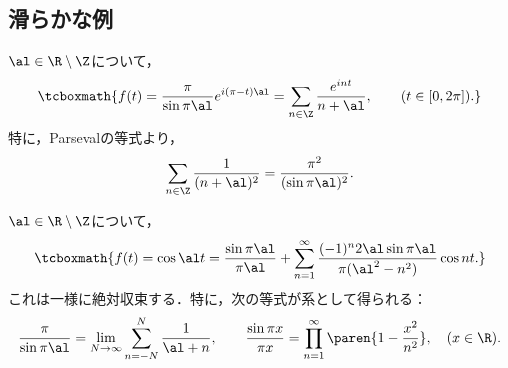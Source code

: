 \documentclass[uplatex,dvipdfmx]{jsreport}
\begin{document}
\subsection{滑らかな例}

\begin{example}
    $\al\in\R\setminus\Z$について，
    \[\tcboxmath{f(t)=\frac{\pi}{\sin\pi\al}e^{i(\pi-t)\al}=\sum_{n\in\Z}\frac{e^{int}}{n+\al},\qquad(t\in[0,2\pi]).}\]
    特に，Parsevalの等式より，
    \[\sum_{n\in\Z}\frac{1}{(n+\al)^2}=\frac{\pi^2}{(\sin\pi\al)^2}.\]
\end{example}



\begin{example}[周期の合わない三角関数]
    $\al\in\R\setminus\Z$について，
    \[\tcboxmath{f(t)=\cos\al t=\frac{\sin\pi\al}{\pi\al}+\sum_{n=1}^\infty\frac{(-1)^n2\al\sin\pi\al}{\pi(\al^2-n^2)}\cos nt.}\]
    これは一様に絶対収束する．特に，次の等式が系として得られる：
    \[\frac{\pi}{\sin\pi\al}=\lim_{N\to\infty}\sum_{n=-N}^N\frac{1}{\al+n},\qquad \frac{\sin\pi x}{\pi x}=\prod^\infty_{n=1}\paren{1-\frac{x^2}{n^2}},\quad(x\in\R).\]
\end{example}
\end{document}
